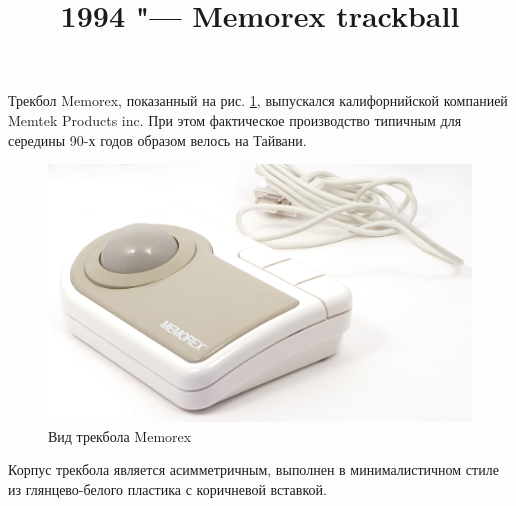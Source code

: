 \documentclass[11pt, a4paper]{article}
\begin{document}
\title{1994 "--- Memorex trackball}
\date{}
\maketitle
{}
Трекбол Memorex, показанный на рис. \ref{fig:MemorexPic}, выпускался калифорнийской компанией Memtek Products inc. При этом фактическое производство типичным для середины 90-х годов образом велось на Тайвани.

\begin{figure}[h]
    \centering
    \includegraphics[scale=0.5]{1994_memorex_trackball/pic_30.jpg}
    \caption{Вид трекбола Memorex}
    \label{fig:MemorexPic}
\end{figure}

Корпус трекбола является асимметричным, выполнен в минималистичном стиле из глянцево-белого пластика с коричневой вставкой.
\end{document}
